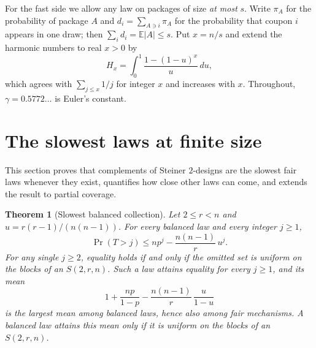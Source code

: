 \documentclass[11pt,a4paper]{article}
\newtheorem{theorem}{Theorem}[section]
\theoremstyle{remark}
\newcommand{\E}{\mathbb E}
\begin{document}
For the fast side we allow any law on packages of size \emph{at most} $s$. Write $\pi_A$ for the probability of package $A$ and $d_i=\sum_{A\ni i}\pi_A$ for the probability that coupon $i$ appears in one draw; then $\sum_i d_i=\E|A|\le s$. Put $x=n/s$ and extend the harmonic numbers to real $x>0$ by
\[
 H_x=\int_0^1\frac{1-(1-u)^x}{u}\,du ,
\]
which agrees with $\sum_{j\le x}1/j$ for integer $x$ and increases with $x$. Throughout, $\gamma=0.5772\ldots$ is Euler's constant.

\section{The slowest laws at finite size}
\label{sec:finite}
This section proves that complements of Steiner $2$-designs are the slowest fair laws whenever they exist, quantifies how close other laws can come, and extends the result to partial coverage.

\begin{theorem}[Slowest balanced collection]\label{thm:steiner}
Let $2\le r<n$ and $u=r(r-1)/(n(n-1))$. For every balanced law and every integer $j\ge1$,
\begin{equation}\label{eq:envelope}
 \Pr(T>j)\le n p^j-\frac{n(n-1)}{r}\,u^j .
\end{equation}
For any single $j\ge2$, equality holds if and only if the omitted set is uniform on the blocks of an $S(2,r,n)$. Such a law attains equality for every $j\ge1$, and its mean
\begin{equation}\label{eq:steinermean}
 1+\frac{np}{1-p}-\frac{n(n-1)}{r}\,\frac{u}{1-u}
\end{equation}
is the largest mean among balanced laws, hence also among fair mechanisms. A balanced law attains this mean only if it is uniform on the blocks of an $S(2,r,n)$.
\end{theorem}
\end{document}
